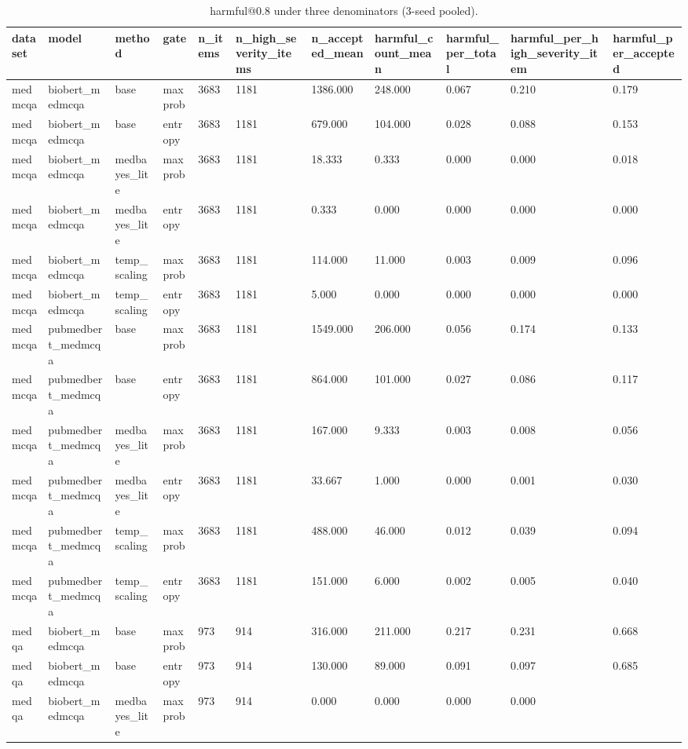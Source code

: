 \begin{table}[htbp]
\centering
\caption{harmful@0.8 under three denominators (3-seed pooled).}
\label{tab:rev_harmful_denominators}
\begin{tabular}{lllllllllll}
\toprule
dataset & model & method & gate & n\_items & n\_high\_severity\_items & n\_accepted\_mean & harmful\_count\_mean & harmful\_per\_total & harmful\_per\_high\_severity\_item & harmful\_per\_accepted \\
\midrule
medmcqa & biobert\_medmcqa & base & maxprob & 3683 & 1181 & 1386.000 & 248.000 & 0.067 & 0.210 & 0.179 \\
medmcqa & biobert\_medmcqa & base & entropy & 3683 & 1181 & 679.000 & 104.000 & 0.028 & 0.088 & 0.153 \\
medmcqa & biobert\_medmcqa & medbayes\_lite & maxprob & 3683 & 1181 & 18.333 & 0.333 & 0.000 & 0.000 & 0.018 \\
medmcqa & biobert\_medmcqa & medbayes\_lite & entropy & 3683 & 1181 & 0.333 & 0.000 & 0.000 & 0.000 & 0.000 \\
medmcqa & biobert\_medmcqa & temp\_scaling & maxprob & 3683 & 1181 & 114.000 & 11.000 & 0.003 & 0.009 & 0.096 \\
medmcqa & biobert\_medmcqa & temp\_scaling & entropy & 3683 & 1181 & 5.000 & 0.000 & 0.000 & 0.000 & 0.000 \\
medmcqa & pubmedbert\_medmcqa & base & maxprob & 3683 & 1181 & 1549.000 & 206.000 & 0.056 & 0.174 & 0.133 \\
medmcqa & pubmedbert\_medmcqa & base & entropy & 3683 & 1181 & 864.000 & 101.000 & 0.027 & 0.086 & 0.117 \\
medmcqa & pubmedbert\_medmcqa & medbayes\_lite & maxprob & 3683 & 1181 & 167.000 & 9.333 & 0.003 & 0.008 & 0.056 \\
medmcqa & pubmedbert\_medmcqa & medbayes\_lite & entropy & 3683 & 1181 & 33.667 & 1.000 & 0.000 & 0.001 & 0.030 \\
medmcqa & pubmedbert\_medmcqa & temp\_scaling & maxprob & 3683 & 1181 & 488.000 & 46.000 & 0.012 & 0.039 & 0.094 \\
medmcqa & pubmedbert\_medmcqa & temp\_scaling & entropy & 3683 & 1181 & 151.000 & 6.000 & 0.002 & 0.005 & 0.040 \\
medqa & biobert\_medmcqa & base & maxprob & 973 & 914 & 316.000 & 211.000 & 0.217 & 0.231 & 0.668 \\
medqa & biobert\_medmcqa & base & entropy & 973 & 914 & 130.000 & 89.000 & 0.091 & 0.097 & 0.685 \\
medqa & biobert\_medmcqa & medbayes\_lite & maxprob & 973 & 914 & 0.000 & 0.000 & 0.000 & 0.000 &  \\

\end{tabular}
\end{table}
